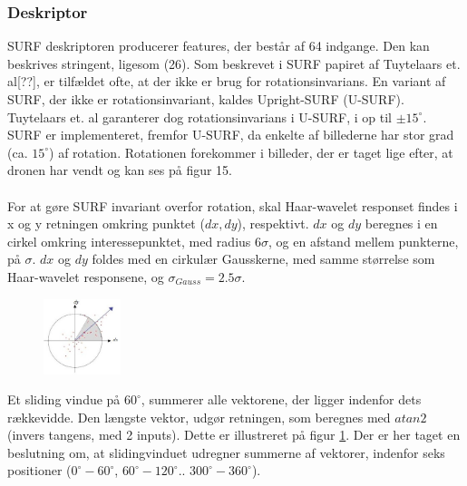 \subsubsection{Deskriptor}
SURF deskriptoren producerer features, der består af 64 indgange. Den kan beskrives stringent, ligesom (26). Som beskrevet i SURF papiret af Tuytelaars et. al[??], er tilfældet ofte, at der ikke er brug for rotationsinvarians. En variant af SURF, der ikke er rotationsinvariant, kaldes Upright-SURF (U-SURF). Tuytelaars et. al garanterer dog rotationsinvarians i U-SURF, i op til $\pm 15^{\circ}$. SURF er implementeret, fremfor U-SURF, da enkelte af billederne har stor grad (ca. $15^{\circ}$) af rotation. Rotationen forekommer i billeder, der er taget lige efter, at dronen har vendt og kan ses på figur 15.
\\
\\
For at gøre SURF invariant overfor rotation, skal Haar-wavelet responset findes i x og y retningen omkring punktet ($dx, dy$), respektivt. $dx$ og $dy$ beregnes i en cirkel omkring interessepunktet, med radius $6\sigma$, og en afstand mellem punkterne, på $\sigma$. $dx$ og $dy$ foldes med en cirkulær Gausskerne, med samme størrelse som Haar-wavelet responsene, og $\sigma_{Gauss} = 2.5\sigma$.
\begin{figure}[H]
    \centering
    \includegraphics[width=0.2\textwidth]{fig/surforientation.jpg}
     \vspace{-1em}
    \begin{center}    
       \caption{\textcolor{gray}{\footnotesize \textit{ }}}
    \label{fig:surforientation}
     \end{center}
     \vspace{-2.5em}
  \end{figure} \noindent
Et sliding vindue på $60^{\circ}$, summerer alle vektorene, der ligger indenfor dets rækkevidde. Den længste vektor, udgør retningen, som beregnes med $atan2$ (invers tangens, med 2 inputs). Dette er illustreret på figur \ref{fig:surforientation}. Der er her taget en beslutning om, at slidingvinduet udregner summerne af vektorer, indenfor seks positioner ($0^{\circ}-60^{\circ}$, $60^{\circ}-120^{\circ}$.. $300^{\circ}-360^{\circ}$). 
\\
